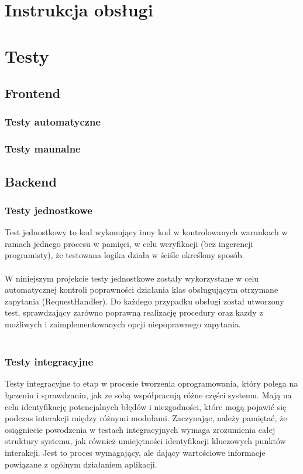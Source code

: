 \documentclass[12pt,a4paper]{article}
\begin{document}
\newpage
\section{Instrukcja obsługi}

\newpage
\section{Testy}
\subsection{Frontend}
\subsubsection{Testy automatyczne}
\subsubsection{Testy maunalne}

\newpage
\subsection{Backend}
\subsubsection{Testy jednostkowe}
Test jednostkowy to kod wykonujący inny kod w kontrolowanych warunkach w ramach jednego procesu w pamięci, w celu weryfikacji (bez ingerencji programisty), że testowana logika działa w ściśle określony sposób.
\\\\
W niniejszym projekcie testy jednostkowe zostały wykorzystane w celu automatycznej kontroli poprawności działania klas obsługującym otrzymane zapytania (RequestHandler). Do każdego przypadku obsługi został utworzony test, sprawdzający zarówno poprawną realizację procedury oraz kazdy z możliwych i zaimplementowanych opcji niepoprawnego zapytania.
\\\\


\subsubsection{Testy integracyjne}
Testy integracyjne to etap w procesie tworzenia oprogramowania, który polega na łączeniu i sprawdzaniu, jak ze sobą współpracują różne części systemu. Mają na celu identyfikację potencjalnych błędów i niezgodności, które mogą pojawić się podczas interakcji między różnymi modułami. Zaczynając, należy pamiętać, że osiągniecie powodzenia w testach integracyjnych wymaga zrozumienia całej struktury systemu, jak również umiejętności identyfikacji kluczowych punktów interakcji. Jest to proces wymagający, ale dający wartościowe informacje powiązane z ogólnym działaniem aplikacji.
\\\\
\end{document}
